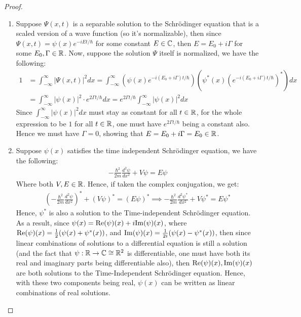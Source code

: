 \documentclass{article}
\begin{document}
\begin{proof}

    \hfil

    \begin{enumerate}
        \item Suppose $\Psi(x,t)$ is a separable solution to the Schrödinger equation that is a scaled version of a wave function (so it's normalizable), then since $\Psi(x,t)=\psi(x)e^{-iE t/\hbar}$ for some constant $E\in\mathbb{C}$, then $E=E_0+i\Gamma$ for some $E_0,\Gamma\in\mathbb{R}$. Now, suppose the solution $\Psi$ itself is normalized, we have the following:
        \begin{align}
            1&=\int_{-\infty}^{\infty}|\Psi(x,t)|^2 dx=\int_{-\infty}^{\infty}\left(\psi(x)e^{-i(E_0+i\Gamma)t/\hbar}\right)\left(\psi^*(x)\left(e^{-i(E_0+i\Gamma)t/\hbar}\right)^*\right)dx\\
            &= \int_{-\infty}^{\infty}|\psi(x)|^2\cdot e^{2\Gamma t/\hbar}dx = e^{2\Gamma t/\hbar}\int_{-\infty}^{\infty}|\psi(x)|^2 dx
        \end{align}
        Since $\int_{-\infty}^{\infty}|\psi(x)|^2 dx$ must stay as constant for all $t\in\mathbb{R}$, for the whole expression to be $1$ for all $t\in\mathbb{R}$, one must have $e^{2\Gamma t/\hbar}$ being a constant also. Hence we must have $\Gamma=0$, showing that $E=E_0+i\Gamma=E_0\in\mathbb{R}$.

        \hfil

        \item Suppose $\psi(x)$ satisfies the time independent Schrödinger equation, we have the following:
        \begin{align}
            -\frac{\hbar^2}{2m}\frac{d^2\psi}{dx^2}+V\psi=E\psi
        \end{align}
        Where both $V,E\in\mathbb{R}$. Hence, if taken the complex conjugation, we get:
        \begin{align}
            \left(-\frac{\hbar^2}{2m}\frac{d^2\psi}{dx^2}\right)^*+(V\psi)^*=(E\psi)^*\implies -\frac{\hbar^2}{2m}\frac{d^2\psi^*}{dx^2}+V\psi^*=E\psi^*
        \end{align}
        Hence, $\psi^*$ is also a solution to the Time-independent Schrödinger equation. As a result, since $\psi(x)=\mathrm{Re}(\psi)(x)+i \mathrm{Im}(\psi)(x)$, where $\mathrm{Re}(\psi)(x)=\frac{1}{2}(\psi(x)+\psi^*(x))$, and $\mathrm{Im}(\psi)(x)=\frac{1}{2i}(\psi(x)-\psi^*(x))$, then since linear combinations of solutions to a differential equation is still a solution (and the fact that $\psi:\mathbb{R}\rightarrow \mathbb{C}\cong \mathbb{R}^2$ is differentiable, one must have both its real and imaginary parts being differentiable also), then $\mathrm{Re}(\psi)(x),\mathrm{Im}(\psi)(x)$ are both solutions to the Time-Independent Schrödinger equation. Hence, with these two components being real, $\psi(x)$ can be written as linear combinations of real solutions.


\end{enumerate}
\end{proof}
\end{document}
